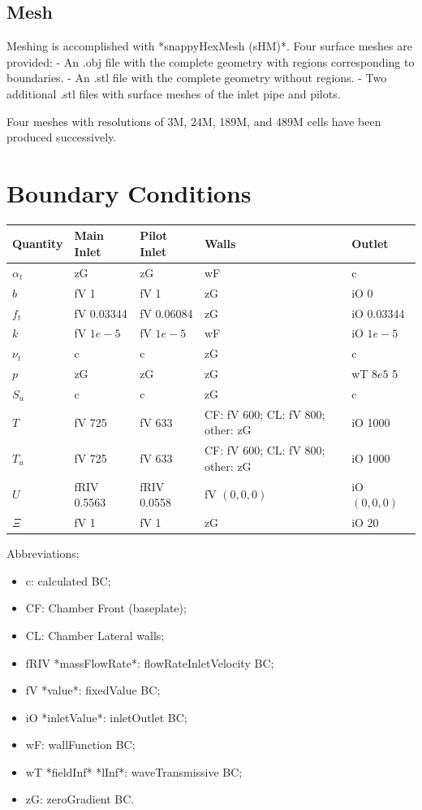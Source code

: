 \subsection*{Mesh}
Meshing is accomplished with *snappyHexMesh (sHM)*. Four surface meshes are provided:
- An .obj file with the complete geometry with regions corresponding to boundaries.
- An .stl file with the complete geometry without regions.
- Two additional .stl files with surface meshes of the inlet pipe and pilots.

Four meshes with resolutions of 3M, 24M, 189M, and 489M cells have been produced successively.

\section*{Boundary Conditions}
\begin{table}[H]
    \centering
    \begin{tabular}{lllll}
        \hline
        Quantity & Main Inlet & Pilot Inlet & Walls & Outlet \\ \hline
        $\alpha_t$ & zG & zG & wF & c \\
        $b$ & fV 1 & fV 1 & zG & iO 0 \\
        $f_t$ & fV 0.03344 & fV 0.06084 & zG & iO 0.03344 \\
        $k$ & fV $1e-5$ & fV $1e-5$ & wF & iO $1e-5$ \\
        $\nu_t$ & c & c & zG & c \\
        $p$ & zG & zG & zG & wT $8e5$ 5 \\
        $S_u$ & c & c & zG & c \\
        $T$ & fV 725 & fV 633 & CF: fV 600; CL: fV 800; other: zG & iO 1000 \\
        $T_u$ & fV 725 & fV 633 & CF: fV 600; CL: fV 800; other: zG & iO 1000 \\
        $U$ & fRIV 0.5563 & fRIV 0.0558 & fV $(0, 0, 0)$ & iO $(0, 0, 0)$ \\
        $\Xi$ & fV 1 & fV 1 & zG & iO 20 \\ \hline
    \end{tabular}
\end{table}

Abbreviations:
\begin{itemize}
    \item c: calculated BC;
    \item CF: Chamber Front (baseplate);
    \item CL: Chamber Lateral walls;
    \item fRIV *massFlowRate*: flowRateInletVelocity BC;
    \item fV *value*: fixedValue BC;
    \item iO *inletValue*: inletOutlet BC;
    \item wF: wallFunction BC;
    \item wT *fieldInf* *lInf*: waveTransmissive BC;
    \item zG: zeroGradient BC.
\end{itemize}

